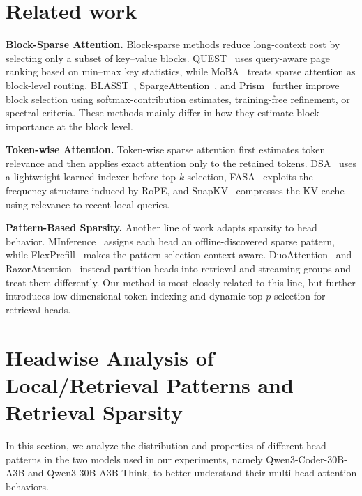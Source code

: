 \documentclass{llmxive}
\providecommand{\beginappendix}{\appendix{\titlefont\sffamily \rtpblue{Appendix}\par}}
\begin{document}
\section{Related work}

\noindent\textbf{Block-Sparse Attention.} Block-sparse methods reduce long-context cost by selecting only a subset of key--value blocks. QUEST~\citep{Quest} uses query-aware page ranking based on min--max key statistics, while MoBA~\citep{MoBA} treats sparse attention as block-level routing. BLASST~\citep{blasst}, SpargeAttention~\citep{spargeattn}, and Prism~\citep{prism} further improve block selection using softmax-contribution estimates, training-free refinement, or spectral criteria. These methods mainly differ in how they estimate block importance at the block level.

\noindent\textbf{Token-wise Attention.} Token-wise sparse attention first estimates token relevance and then applies exact attention only to the retained tokens. DSA~\citep{dsa} uses a lightweight learned indexer before top-$k$ selection, FASA~\citep{fasa} exploits the frequency structure induced by RoPE, and SnapKV~\citep{snapkv} compresses the KV cache using relevance to recent local queries.

\noindent\textbf{Pattern-Based Sparsity.} Another line of work adapts sparsity to head behavior. MInference~\citep{minference} assigns each head an offline-discovered sparse pattern, while FlexPrefill~\citep{flexprefill} makes the pattern selection context-aware. DuoAttention~\citep{duoattn} and RazorAttention~\citep{razorattn} instead partition heads into retrieval and streaming groups and treat them differently. Our method is most closely related to this line, but further introduces low-dimensional token indexing and dynamic top-$p$ selection for retrieval heads.



{
\small


}


\beginappendix

\section{Headwise Analysis of Local/Retrieval Patterns and Retrieval Sparsity}
\label{appd:headwise}

In this section, we analyze the distribution and properties of different head patterns in the two models used in our experiments, namely Qwen3-Coder-30B-A3B and Qwen3-30B-A3B-Think, to better understand their multi-head attention behaviors.
\end{document}
